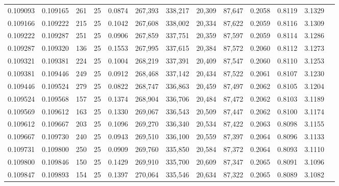 \begin{tabular}{rrrrrrrrrrrrr}
0.109093 & 0.109165 &   261 &  25 &                                     0.0874 & 267,393 & 338,217 &  20,309 &  87,647 & 0.2058 & 0.8119 & 3.1329 \\
0.109166 & 0.109222 &   215 &  25 &                                     0.1042 & 267,608 & 338,002 &  20,334 &  87,622 & 0.2059 & 0.8116 & 3.1309 \\
0.109222 & 0.109287 &   251 &  25 &                                     0.0906 & 267,859 & 337,751 &  20,359 &  87,597 & 0.2059 & 0.8114 & 3.1286 \\
0.109287 & 0.109320 &   136 &  25 &                                     0.1553 & 267,995 & 337,615 &  20,384 &  87,572 & 0.2060 & 0.8112 & 3.1273 \\
0.109321 & 0.109381 &   224 &  25 &                                     0.1004 & 268,219 & 337,391 &  20,409 &  87,547 & 0.2060 & 0.8110 & 3.1253 \\
0.109381 & 0.109446 &   249 &  25 &                                     0.0912 & 268,468 & 337,142 &  20,434 &  87,522 & 0.2061 & 0.8107 & 3.1230 \\
0.109446 & 0.109524 &   279 &  25 &                                     0.0822 & 268,747 & 336,863 &  20,459 &  87,497 & 0.2062 & 0.8105 & 3.1204 \\
0.109524 & 0.109568 &   157 &  25 &                                     0.1374 & 268,904 & 336,706 &  20,484 &  87,472 & 0.2062 & 0.8103 & 3.1189 \\
0.109569 & 0.109612 &   163 &  25 &                                     0.1330 & 269,067 & 336,543 &  20,509 &  87,447 & 0.2062 & 0.8100 & 3.1174 \\
0.109612 & 0.109667 &   203 &  25 &                                     0.1096 & 269,270 & 336,340 &  20,534 &  87,422 & 0.2063 & 0.8098 & 3.1155 \\
0.109667 & 0.109730 &   240 &  25 &                                     0.0943 & 269,510 & 336,100 &  20,559 &  87,397 & 0.2064 & 0.8096 & 3.1133 \\
0.109731 & 0.109800 &   250 &  25 &                                     0.0909 & 269,760 & 335,850 &  20,584 &  87,372 & 0.2064 & 0.8093 & 3.1110 \\
0.109800 & 0.109846 &   150 &  25 &                                     0.1429 & 269,910 & 335,700 &  20,609 &  87,347 & 0.2065 & 0.8091 & 3.1096 \\
0.109847 & 0.109893 &   154 &  25 &                                     0.1397 & 270,064 & 335,546 &  20,634 &  87,322 & 0.2065 & 0.8089 & 3.1082 \\

\end{tabular}
